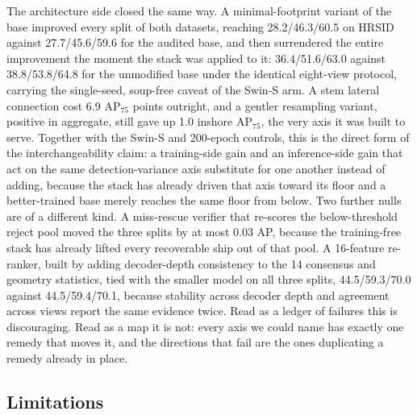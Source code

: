The architecture side closed the same way. A minimal-footprint variant of the base improved every split of both datasets, reaching 28.2/46.3/60.5 on HRSID against 27.7/45.6/59.6 for the audited base, and then surrendered the entire improvement the moment the stack was applied to it: 36.4/51.6/63.0 against 38.8/53.8/64.8 for the unmodified base under the identical eight-view protocol, carrying the single-seed, soup-free caveat of the Swin-S arm. A stem lateral connection cost 6.9 AP$_{75}$ points outright, and a gentler resampling variant, positive in aggregate, still gave up 1.0 inshore AP$_{75}$, the very axis it was built to serve. Together with the Swin-S and 200-epoch controls, this is the direct form of the interchangeability claim: a training-side gain and an inference-side gain that act on the same detection-variance axis substitute for one another instead of adding, because the stack has already driven that axis toward its floor and a better-trained base merely reaches the same floor from below. Two further nulls are of a different kind. A miss-rescue verifier that re-scores the below-threshold reject pool moved the three splits by at most 0.03 AP, because the training-free stack has already lifted every recoverable ship out of that pool. A 16-feature re-ranker, built by adding decoder-depth consistency to the 14 consensus and geometry statistics, tied with the smaller model on all three splits, 44.5/59.3/70.0 against 44.5/59.4/70.1, because stability across decoder depth and agreement across views report the same evidence twice. Read as a ledger of failures this is discouraging. Read as a map it is not: every axis we could name has exactly one remedy that moves it, and the directions that fail are the ones duplicating a remedy already in place.

\subsection{Limitations}
\label{sec:disc-limitations}

